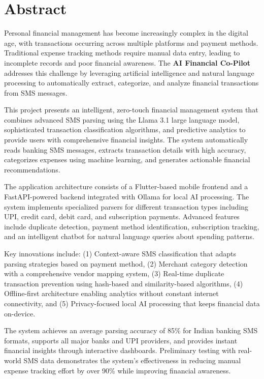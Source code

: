 \documentclass[11pt,a4paper]{report}
\begin{document}
\chapter*{Abstract}

Personal financial management has become increasingly complex in the digital age, with transactions occurring across multiple platforms and payment methods. Traditional expense tracking methods require manual data entry, leading to incomplete records and poor financial awareness. The \textbf{AI Financial Co-Pilot} addresses this challenge by leveraging artificial intelligence and natural language processing to automatically extract, categorize, and analyze financial transactions from SMS messages.

This project presents an intelligent, zero-touch financial management system that combines advanced SMS parsing using the Llama 3.1 large language model, sophisticated transaction classification algorithms, and predictive analytics to provide users with comprehensive financial insights. The system automatically reads banking SMS messages, extracts transaction details with high accuracy, categorizes expenses using machine learning, and generates actionable financial recommendations.

The application architecture consists of a Flutter-based mobile frontend and a FastAPI-powered backend integrated with Ollama for local AI processing. The system implements specialized parsers for different transaction types including UPI, credit card, debit card, and subscription payments. Advanced features include duplicate detection, payment method identification, subscription tracking, and an intelligent chatbot for natural language queries about spending patterns.

Key innovations include: (1) Context-aware SMS classification that adapts parsing strategies based on payment method, (2) Merchant category detection with a comprehensive vendor mapping system, (3) Real-time duplicate transaction prevention using hash-based and similarity-based algorithms, (4) Offline-first architecture enabling analytics without constant internet connectivity, and (5) Privacy-focused local AI processing that keeps financial data on-device.

The system achieves an average parsing accuracy of 85\% for Indian banking SMS formats, supports all major banks and UPI providers, and provides instant financial insights through interactive dashboards. Preliminary testing with real-world SMS data demonstrates the system's effectiveness in reducing manual expense tracking effort by over 90\% while improving financial awareness.
\end{document}
